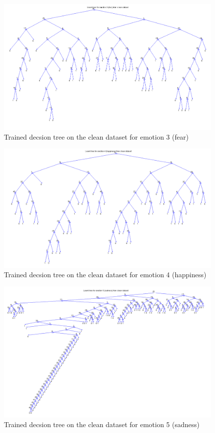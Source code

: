 \documentclass[a4paper]{article}
\begin{document}
\begin{figure}[!ht]
\center
\includegraphics[width=0.75\columnwidth]{FearTree} %
\caption{Trained decsion tree on the clean dataset for emotion 3 (fear)}
\end{figure}

\begin{figure}[!ht]
\center
\includegraphics[width=0.75\columnwidth]{HappinessTree} %
\caption{Trained decsion tree on the clean dataset for emotion 4 (happiness)}
\end{figure}

\begin{figure}[!ht]
\center
\includegraphics[width=0.75\columnwidth]{SadnessTree} %
\caption{Trained decsion tree on the clean dataset for emotion 5 (sadness)}
\end{figure}
\end{document}

